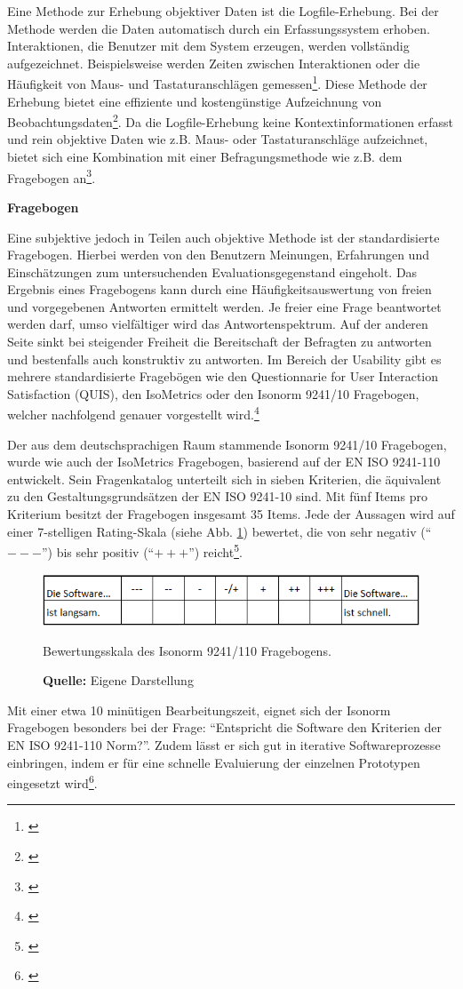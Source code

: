 Eine Methode zur Erhebung objektiver Daten ist die Logfile-Erhebung. Bei der Methode werden die Daten automatisch durch ein Erfassungssystem erhoben. Interaktionen, die Benutzer mit dem System erzeugen, werden vollständig aufgezeichnet. Beispielsweise werden Zeiten zwischen Interaktionen oder die Häufigkeit von Maus- und Tastaturanschlägen gemessen\footnote{\cite[vgl.][63]{Hegner2003}}. Diese Methode der Erhebung bietet eine effiziente und kostengünstige Aufzeichnung von Beobachtungsdaten\footnote{\cite[vgl.][Kap. 65.3]{Baur2014}}. Da die Logfile-Erhebung keine Kontextinformationen erfasst und rein objektive Daten wie z.B. Maus- oder Tastaturanschläge aufzeichnet, bietet sich eine Kombination mit einer Befragungsmethode wie z.B. dem Fragebogen an\footnote{\cite[vgl.][17\psq]{Hegner2003}}.

\textbf{Fragebogen}

Eine subjektive jedoch in Teilen auch objektive Methode ist der standardisierte Fragebogen. Hierbei werden von den Benutzern Meinungen, Erfahrungen und Einschätzungen zum untersuchenden Evaluationsgegenstand eingeholt. Das Ergebnis eines Fragebogens kann durch eine Häufigkeitsauswertung von freien und vorgegebenen Antworten ermittelt werden. Je freier eine Frage beantwortet werden darf, umso vielfältiger wird das Antwortenspektrum. Auf der anderen Seite sinkt bei steigender Freiheit die Bereitschaft der Befragten zu antworten und bestenfalls auch konstruktiv zu antworten. Im Bereich der Usability gibt es mehrere standardisierte Fragebögen wie den Questionnarie for User Interaction Satisfaction (QUIS), den IsoMetrics oder den Isonorm 9241/10 Fragebogen, welcher nachfolgend genauer vorgestellt wird.\footnote{\cite[vgl.][Kap. 4.5.1.1]{Hegner2003}}

Der aus dem deutschsprachigen Raum stammende Isonorm 9241/10 Fragebogen, wurde wie auch der IsoMetrics Fragebogen, basierend auf der EN ISO 9241-110 entwickelt. Sein Fragenkatalog unterteilt sich in sieben Kriterien, die äquivalent zu den Gestaltungsgrundsätzen der EN ISO 9241-10 sind. Mit fünf Items pro Kriterium besitzt der Fragebogen insgesamt 35 Items. Jede der Aussagen wird auf einer 7-stelligen Rating-Skala (siehe Abb. \ref{fig:IsonormBewertungsskala}) bewertet, die von sehr negativ (\enquote{$---$}) bis sehr positiv (\enquote{$+++$}) reicht\footnote{\cite[vgl.][Kap. 3.3]{Figl2010}}. 
\begin{figure}[H]
  \centering
  \includegraphics[scale=0.95]{img/Isonorm_Bewertungsskala.PNG}
  \caption{Bewertungsskala des Isonorm 9241/110 Fragebogens.}
  \caption*{\textbf{Quelle:} Eigene Darstellung}
  \label{fig:IsonormBewertungsskala}
\end{figure}
Mit einer etwa 10 minütigen Bearbeitungszeit, eignet sich der Isonorm Fragebogen besonders bei der Frage: \enquote{Entspricht die Software den Kriterien der EN ISO 9241-110 Norm?}. Zudem lässt er sich gut in iterative Softwareprozesse einbringen, indem er für eine schnelle Evaluierung der einzelnen Prototypen eingesetzt wird\footnote{\cite[vgl.][Kap. 3.3]{Figl2010}}.

